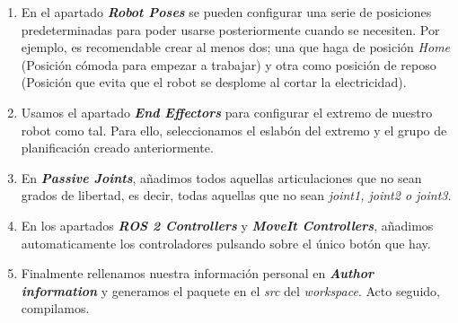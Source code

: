 \begin{enumerate}
\item En el apartado \textbf{\textit{\guillemotleft Robot Poses\guillemotright}} se pueden configurar una serie de posiciones predeterminadas 
para poder usarse posteriormente cuando se necesiten. Por ejemplo, es recomendable crear al menos dos; una que haga de posición \textit{Home} 
(Posición cómoda para empezar a trabajar) y otra como posición de reposo (Posición que evita que el robot se desplome al cortar la electricidad).

\item Usamos el apartado \textbf{\textit{\guillemotleft End Effectors \guillemotright}} para configurar el extremo de nuestro robot como tal. Para ello, 
seleccionamos el eslabón del extremo y el grupo de planificación creado anteriormente. 

\item En \textbf{\textit{\guillemotleft Passive Joints\guillemotright}}, añadimos todos aquellas articulaciones que no sean grados de libertad, 
es decir, todas aquellas que no sean \textit{joint1, joint2 o joint3}.

\item En los apartados \textbf{\textit{\guillemotleft ROS 2 Controllers\guillemotright}} y 
\textbf{\textit{\guillemotleft MoveIt Controllers\guillemotright}}, añadimos automaticamente los controladores pulsando sobre el único botón que hay.

\item Finalmente rellenamos nuestra información personal en \textbf{\textit{\guillemotleft Author information\guillemotright}} y generamos el 
paquete en el \textit{src} del \textit{workspace}. Acto seguido, compilamos.
\end{enumerate}

